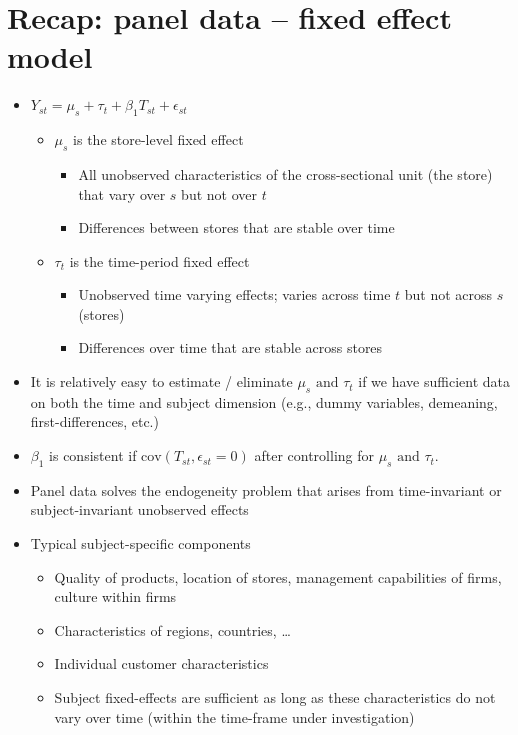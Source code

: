 \documentclass[10pt]{article}
\begin{document}
\section{Recap: panel data -- fixed effect model}
\begin{itemize}
    \item $Y_{st} = \mu_s + \tau_t + \beta_1T_{st} + \epsilon_{st} $
    \begin{itemize}
        \item $\mu_s $ is the store-level fixed effect 
        \begin{itemize}
            \item All unobserved characteristics of the cross-sectional unit (the store) that vary over $ s $ but not over $t $
            \item Differences between stores that are stable over time 
        \end{itemize}
        \item $\tau_t $ is the time-period fixed effect 
        \begin{itemize}
            \item Unobserved time varying effects; varies across time $t $ but not across $s $ (stores)
            \item Differences over time that are stable across stores 
        \end{itemize}
    \end{itemize}
    \item It is relatively easy to estimate / eliminate $\mu_s \text{ and } \tau_t $ if we have sufficient data on both the time and subject dimension (e.g., dummy variables, demeaning, first-differences, etc.)
    \item $\beta_1 $ is consistent if $\text{cov}(T_{st}, \epsilon_{st} = 0 ) $ after controlling for $\mu_s \text{ and } \tau_t $.
    \item Panel data solves the endogeneity problem that arises from time-invariant or subject-invariant unobserved effects 
    \item Typical subject-specific components 
    \begin{itemize}
        \item Quality of products, location of stores, management capabilities of firms, culture within firms 
        \item Characteristics of regions, countries, \dots 
        \item Individual customer characteristics 
        \item Subject fixed-effects are sufficient as long as these characteristics do not vary over time (within the time-frame under investigation)

\end{itemize}
\end{itemize}
\end{document}
